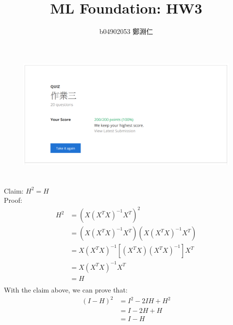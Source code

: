\documentclass[12pt,a4paper]{article}
\title{ML Foundation: HW3}
\author{b04902053 鄭淵仁}
\begin{document}
\maketitle
\section{} %

\begin{figure}[h!]
	\centering
	\includegraphics[width=\linewidth]{code/q1.png}
\end{figure}

\section{} %

Claim: ${H}^{2} = H$ \\
Proof:
\[
	\begin{aligned}
		{H}^{2} &= {(X {({X}^{T}X)}^{-1} {X}^{T})} ^ {2} \\
				&= (X {({X}^{T}X)}^{-1} {X}^{T}) (X {({X}^{T}X)}^{-1} {X}^{T}) \\
				&= X {({X}^{T}X)}^{-1} [ ({X}^{T} X) {({X}^{T}X)}^{-1} ] {X}^{T} \\
				&= X {({X}^{T}X)}^{-1} {X}^{T} \\
				&= H \\
	\end{aligned}
\]
With the claim above, we can prove that:
\[
	\begin{aligned}
		{(I-H)}^{2} &= {I}^{2} - 2IH + {H}^{2} \\
					&= I - 2H + H \\
					&= I - H \\
	\end{aligned}
\]

\section{} %
\end{document}
